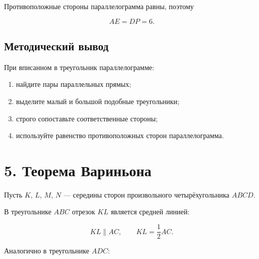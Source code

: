 \documentclass[a4paper,12pt]{article}
\begin{document}
Противоположные стороны параллелограмма равны, поэтому

\[
\boxed{AE=DP=6}.
\]

\subsection*{\color{darkaccent}Методический вывод}

При вписанном в треугольник параллелограмме:

\begin{enumerate}
    \item найдите пары параллельных прямых;
    \item выделите малый и большой подобные треугольники;
    \item строго сопоставьте соответственные стороны;
    \item используйте равенство противоположных сторон параллелограмма.
\end{enumerate}

\section*{\color{darkaccent}5. Теорема Вариньона}

Пусть $K$, $L$, $M$, $N$ --- середины сторон произвольного четырёхугольника $ABCD$.

\begin{center}
\end{center}

В треугольнике $ABC$ отрезок $KL$ является средней линией:

\[
KL\parallel AC,
\qquad
KL=\frac12 AC.
\]

Аналогично в треугольнике $ADC$:
\end{document}
